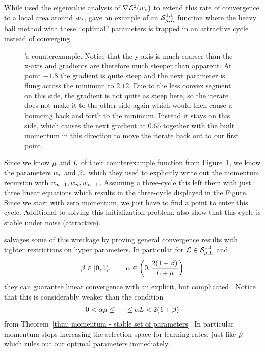 While
\textcite[pp. 65-67]{polyakIntroductionOptimization1987} used the eigenvalue
analysis of \(\nabla\mathcal{L}^2(w_*)\) to extend this rate of convergence
to a local area around \(w_*\), \textcite[pp. 78-79]{lessardAnalysisDesignOptimization2016}
gave an example of an \(\mathcal{S}^{1,1}_{{\mu},{L}}\) function where
the heavy ball method with these ``optimal'' parameters is trapped in an attractive
cycle instead of converging. 
%
\begin{figure}[h]
	\centering
	\def\svgwidth{1\textwidth}
	
	\caption{
		\citeauthor{lessardAnalysisDesignOptimization2016}'s counterexample.
		Notice that the y-axis is much coarser than the x-axis and gradients are
		therefore much steeper than apparent. At point \(-1.8\) the gradient is
		quite steep and the next parameter is flung across the minimum to
		\(2.12\). Due to the less convex segment on this side, the gradient is
		not quite as steep here, so the iterate does not make it to the other
		side again which would then cause a bouncing back and forth to the
		minimum. Instead it stays on this side, which causes the next gradient
		at \(0.65\) together with the built momentum in this direction to move the
		iterate back out to our first point.
	}
	\label{fig: heavy ball counterexample}
\end{figure}

Since we know \(\mu\) and \(L\) of their counterexample function from
Figure~\ref{fig: heavy ball counterexample}, we know the parameters \(\alpha_*\)
and \(\beta_*\) which they used to explicitly write out the momentum recursion
with \(w_{n+1}, w_{n}, w_{n-1}\). Assuming a three-cycle
this left them with just three linear equations which results in the three-cycle
displayed in the Figure. Since we start with zero momentum, we just have to
find a point to enter this cycle. Additional to solving this initialization
problem, \textcite[pp. 93-94]{lessardAnalysisDesignOptimization2016} also show
that this cycle is stable under noise (attractive).

\textcite{ghadimiGlobalConvergenceHeavyball2015} salvages some of this wreckage
by proving general convergence results with tighter restrictions on hyper
parameters. In particular for \(\mathcal{L}\in\mathcal{S}^{1,1}_{{\mu},{L}}\) and
\begin{align*}
	\beta\in[0,1),
	\qquad \alpha\in \left(0, \frac{2(1-\beta)}{L+\mu}\right)
\end{align*}
they can guarantee linear convergence with an explicit, but complicated
. Notice that this is
considerably weaker than the condition
\begin{align*}
	0<\alpha\mu \le \dots \le \alpha L < 2(1+\beta)
\end{align*}
from Theorem~\ref{thm: momentum - stable set of parameters}. In particular
momentum stops increasing the selection space for learning rates, just like
\(\mu\) which rules out our optimal parameters immediately. 

